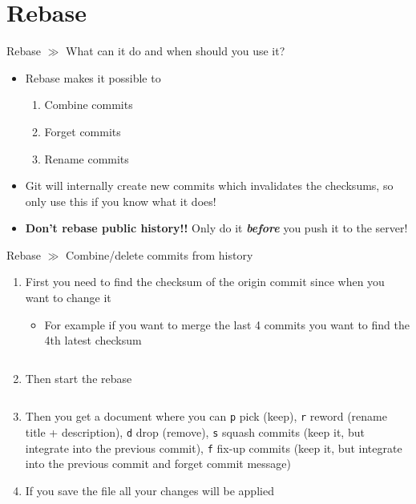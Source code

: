 \documentclass[10pt]{beamer}
\begin{document}
\section{Rebase}

\begin{frame}{Rebase $\gg$ What can it do and when should you use it?}
\begin{center}
\begin{itemize}
\item Rebase makes it possible to
\begin{enumerate}
	\item Combine commits
	\item Forget commits
	\item Rename commits
\end{enumerate}
\item Git will internally create new commits which invalidates the checksums, so only use this if you know what it does!
\item \textbf{Don't rebase public history!!} Only do it \textbf{\textit{before}} you push it to the server!
\end{itemize}
\end{center}
\end{frame}

\begin{frame}{Rebase $\gg$ Combine/delete commits from history}
\begin{center}
	\begin{enumerate}
		\item First you need to find the checksum of the origin commit since when you want to change it
		\begin{itemize}
			\item For example if you want to merge the last 4 commits you want to find the 4th latest checksum
		\end{itemize}
	\inputminted[bgcolor=lightGreyCustom,fontsize=\scriptsize]{sh}{./resources/git_rebase_01_checksums.sh}
	\item Then start the rebase
	\inputminted[bgcolor=lightGreyCustom,fontsize=\scriptsize]{sh}{./resources/git_rebase_02_rebase.sh}
	\item Then you get a document where you can \texttt{p} pick (keep), \texttt{r} reword (rename title + description), \texttt{d} drop (remove), \texttt{s} squash commits (keep it, but integrate into the previous commit), \texttt{f} fix-up commits (keep it, but integrate into the previous commit and forget commit message)
	\item If you save the file all your changes will be applied
	\end{enumerate}
\end{center}
\end{frame}
\end{document}
